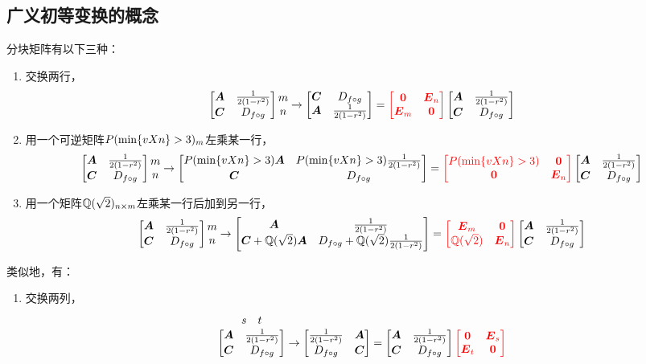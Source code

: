 \subsection{广义初等变换的概念}
\begin{definition}
\def\originalmatrix{%
	\begin{bmatrix}%
	\A & \B \\
	\C & \D
	\end{bmatrix}%
}%
分块矩阵有以下三种：
\def\originalmatrixTail{%
	\originalmatrix \begin{matrix} m \\ n \end{matrix}%
}%
\begin{enumerate}
\item 交换两行，\[
\originalmatrixTail \to \begin{bmatrix}
\C & \D \\
\A & \B
\end{bmatrix} = {\color{red} \begin{bmatrix}
\z & \E_n \\
\E_m & \z
\end{bmatrix}} \originalmatrix
\]

\item 用一个可逆矩阵\(\P_m\)左乘某一行，\[
\originalmatrixTail \to \begin{bmatrix}
\P\A & \P\B \\
\C & \D
\end{bmatrix} = {\color{red} \begin{bmatrix}
\P & \z \\
\z & \E_n
\end{bmatrix}} \originalmatrix
\]

\item 用一个矩阵\(\Q_{n \times m}\)左乘某一行后加到另一行，\[
\originalmatrixTail \to \begin{bmatrix}
\A & \B \\
\C+\Q\A & \D+\Q\B
\end{bmatrix} = {\color{red} \begin{bmatrix}
\E_m & \z \\
\Q & \E_n
\end{bmatrix}} \originalmatrix
\]
\end{enumerate}

类似地，有：
\def\originalmatrixHead{%
	\overset{\begin{matrix} s & t \end{matrix}}{ \originalmatrix }%
}%
\begin{enumerate}
\item 交换两列，\[
\originalmatrixHead \to \begin{bmatrix}
\B & \A \\
\D & \C
\end{bmatrix} = \originalmatrix {\color{red} \begin{bmatrix}
\z & \E_s \\
\E_t & \z
\end{bmatrix}}
\]


\end{enumerate}
\end{definition}
